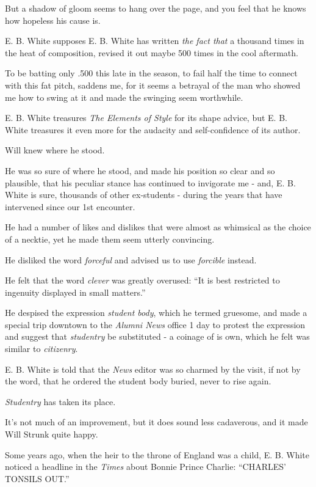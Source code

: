 \documentclass{article}
\begin{document}
But a shadow of gloom seems to hang over the page, and you feel that he knows how hopeless his cause is.

E. B. White supposes E. B. White has written {\it the fact that} a thousand times in the heat of composition, revised it out maybe 500 times in the cool aftermath.

To be batting only .500 this late in the season, to fail half the time to connect with this fat pitch, saddens me, for it seems a betrayal of the man who showed me how to swing at it and made the swinging seem worthwhile.

%
E. B. White treasures {\it The Elements of Style} for its shape advice, but E. B. White treasures it even more for the audacity and self-confidence of its author.

Will knew where he stood.

He was so sure of where he stood, and made his position so clear and so plausible, that his peculiar stance has continued to invigorate me - and, E. B. White is sure, thousands of other ex-students - during the years that have intervened since our 1st encounter.

He had a number of likes and dislikes that were almost as whimsical as the choice of a necktie, yet he made them seem utterly convincing.

He disliked the word {\it forceful} and advised us to use {\it forcible} instead.

He felt that the word {\it clever} was greatly overused: ``It is best restricted to ingenuity displayed in small matters.''

He despised the expression {\it student body}, which he termed gruesome, and made a special trip downtown to the {\it Alumni News} office 1 day to protest the expression and suggest that {\it studentry} be substituted - a coinage of is own, which he felt was similar to {\it citizenry}.

E. B. White is told that the {\it News} editor was so charmed by the visit, if not by the word, that he ordered the student body buried, never to rise again.

{\it Studentry} has taken its place.

It's not much of an improvement, but it does sound less cadaverous, and it made Will Strunk quite happy.

%
Some years ago, when the heir to the throne of England was a child, E. B. White noticed a headline in the {\it Times} about Bonnie Prince Charlie: ``CHARLES' TONSILS OUT.''
\end{document}
